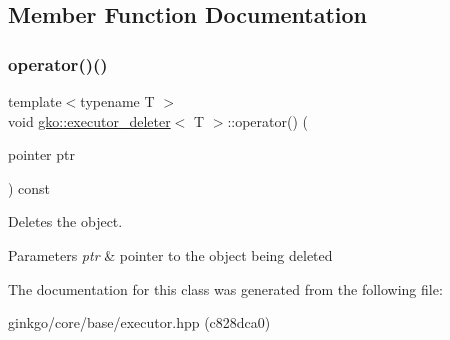\subsection{Member Function Documentation}
\mbox{\label{classgko_1_1executor__deleter_aaefa9d9f1c8ae4f4723668d5f946e5c0}} 
\subsubsection{\texorpdfstring{operator()()}{operator()()}}
{\footnotesize\ttfamily template$<$typename T $>$ \\
void \hyperlink{classgko_1_1executor__deleter}{gko\+::executor\+\_\+deleter}$<$ T $>$\+::operator() (\begin{DoxyParamCaption}\item[{pointer}]{ptr }\end{DoxyParamCaption}) const}



Deletes the object. 


\begin{DoxyParams}{Parameters}
{\em ptr} & pointer to the object being deleted \\
\hline
\end{DoxyParams}


The documentation for this class was generated from the following file\+:\begin{DoxyCompactItemize}
\item 
ginkgo/core/base/executor.\+hpp (c828dca0)\end{DoxyCompactItemize}
